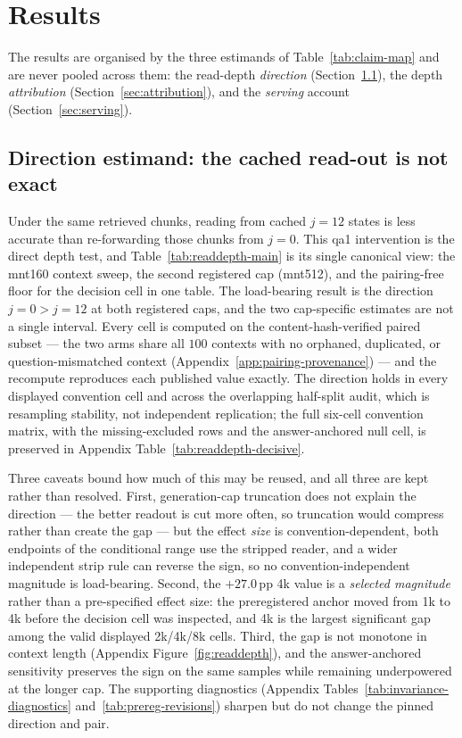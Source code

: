 \section{Results}
\label{sec:experiments}

The results are organised by the three estimands of Table~\ref{tab:claim-map}
and are never pooled across them: the read-depth \emph{direction}
(Section~\ref{sec:readdepth}), the depth \emph{attribution}
(Section~\ref{sec:attribution}), and the \emph{serving} account
(Section~\ref{sec:serving}).

\subsection{Direction estimand: the cached read-out is not exact}
\label{sec:readdepth}

Under the same retrieved chunks, reading from cached $j{=}12$ states is less
accurate than re-forwarding those chunks from $j{=}0$.  This qa1 intervention is
the direct depth test, and Table~\ref{tab:readdepth-main} is its single canonical
view: the mnt160 context sweep, the second registered cap (mnt512), and the
pairing-free floor for the decision cell in one table.  The load-bearing result is
the direction $j{=}0{>}j{=}12$ at both registered caps, and the two cap-specific
estimates are not a single interval.  Every cell is computed on the
content-hash-verified paired subset --- the two arms share all $100$ contexts with
no orphaned, duplicated, or question-mismatched context
(Appendix~\ref{app:pairing-provenance}) --- and the recompute reproduces each
published value exactly.  The direction holds in every displayed convention cell
and across the overlapping half-split audit, which is resampling stability, not
independent replication; the full six-cell convention matrix, with the
missing-excluded rows and the answer-anchored null cell, is preserved in Appendix
Table~\ref{tab:readdepth-decisive}.

Three caveats bound how much of this may be reused, and all three are kept
rather than resolved.  First, generation-cap truncation does not explain the
direction --- the better readout is cut more often, so truncation would compress
rather than create the gap --- but the effect \emph{size} is
convention-dependent, both endpoints of the conditional range use the stripped
reader, and a wider independent strip rule can reverse the sign, so no
convention-independent magnitude is load-bearing.  Second, the $+27.0$\,pp 4k
value is a \emph{selected magnitude} rather than a pre-specified effect size: the
preregistered anchor moved from 1k to 4k before the decision cell was inspected,
and 4k is the largest significant gap among the valid displayed 2k/4k/8k cells.
Third, the gap is not monotone in context length (Appendix
Figure~\ref{fig:readdepth}), and the answer-anchored sensitivity preserves the
sign on the same samples while remaining underpowered at the longer cap.  The
supporting diagnostics (Appendix Tables~\ref{tab:invariance-diagnostics}
and~\ref{tab:prereg-revisions}) sharpen but do not change the pinned direction
and pair.

